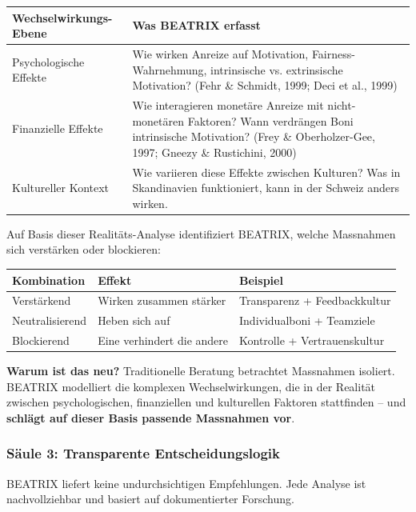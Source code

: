 \documentclass[11pt,a4paper]{article}
\begin{document}
\begin{table}[h]
\centering
\begin{tabular}{@{}L{4cm}L{9cm}@{}}
\toprule
\textbf{Wechselwirkungs-Ebene} & \textbf{Was BEATRIX erfasst} \\
\midrule
Psychologische Effekte & Wie wirken Anreize auf Motivation, Fairness-Wahrnehmung, intrinsische vs. extrinsische Motivation? (Fehr \& Schmidt, 1999; Deci et al., 1999) \\
Finanzielle Effekte & Wie interagieren monetäre Anreize mit nicht-monetären Faktoren? Wann verdrängen Boni intrinsische Motivation? (Frey \& Oberholzer-Gee, 1997; Gneezy \& Rustichini, 2000) \\
Kultureller Kontext & Wie variieren diese Effekte zwischen Kulturen? Was in Skandinavien funktioniert, kann in der Schweiz anders wirken. \\
\bottomrule
\end{tabular}
\end{table}

Auf Basis dieser Realitäts-Analyse identifiziert BEATRIX, welche Massnahmen sich verstärken oder blockieren:

\begin{table}[h]
\centering
\begin{tabular}{@{}L{3cm}L{4cm}L{6cm}@{}}
\toprule
\textbf{Kombination} & \textbf{Effekt} & \textbf{Beispiel} \\
\midrule
Verstärkend & Wirken zusammen stärker & Transparenz + Feedbackkultur \\
Neutralisierend & Heben sich auf & Individualboni + Teamziele \\
Blockierend & Eine verhindert die andere & Kontrolle + Vertrauenskultur \\
\bottomrule
\end{tabular}
\end{table}

\textbf{Warum ist das neu?} Traditionelle Beratung betrachtet Massnahmen isoliert. BEATRIX modelliert die komplexen Wechselwirkungen, die in der Realität zwischen psychologischen, finanziellen und kulturellen Faktoren stattfinden -- und \textbf{schlägt auf dieser Basis passende Massnahmen vor}.

\subsubsection{Säule 3: Transparente Entscheidungslogik}

BEATRIX liefert keine undurchsichtigen Empfehlungen. Jede Analyse ist nachvollziehbar und basiert auf dokumentierter Forschung.
\end{document}
